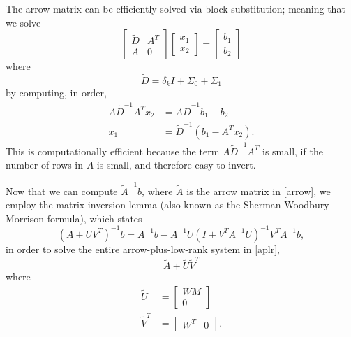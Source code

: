 \documentclass{article}
\begin{document}
The arrow matrix can be efficiently solved via block substitution;
    meaning that we solve
    \begin{equation}
    \begin{bmatrix}
        \tilde{D} & A^T \\
        A & 0 
    \end{bmatrix} 
    \begin{bmatrix} x_1 \\ x_2 \end{bmatrix} 
    =
    \begin{bmatrix} b_1 \\ b_2 \end{bmatrix} 
    \end{equation}
    where
    \begin{equation} \tilde{D} = \delta_k I + \Sigma_0 + \Sigma_1 \end{equation}
    by computing, in order,
    \begin{subequations}\begin{align}
    A \tilde{D}^{-1} A^T x_2 &= 
        A \tilde{D}^{-1} b_1 - b_2 \\
    x_1 &= \tilde{D}^{-1}
        (b_1 - A^T x_2).
    \end{align}\end{subequations}
This is computationally efficient because the term $A \tilde{D}^{-1} A^T$ is 
    small, if the number of rows in $A$ is small,
    and therefore easy to invert.

Now that we can compute $\tilde{A}^{-1} b$, 
    where $\tilde{A}$ is the arrow matrix in \eqref{arrow},
    we employ the matrix inversion lemma
    (also known as the Sherman-Woodbury-Morrison formula),
    which states
    \begin{equation}
    (A+UV^T)^{-1}b = A^{-1}b - A^{-1}U(I + V^T A^{-1}U)^{-1} V^T A^{-1}b,
    \end{equation}
    in order to solve the entire arrow-plus-low-rank system in \eqref{aplr},
    \begin{equation} \tilde{A} + \tilde{U}\tilde{V}^T \end{equation}
    where
    \begin{subequations}\begin{align}
    \tilde{U} &= \begin{bmatrix} WM \\ 0 \end{bmatrix} \\
    \tilde{V}^T &= \begin{bmatrix} W^T & 0 \end{bmatrix}.
    \end{align}\end{subequations}
\end{document}
